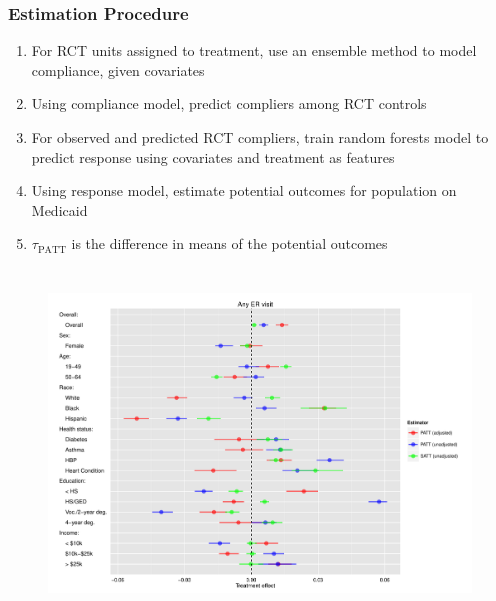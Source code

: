 \documentclass{beamer}
\begin{document}
\begin{frame} 
\frametitle{Estimation Procedure}
\begin{enumerate}
\item For RCT units assigned to treatment, use an ensemble method to model compliance, given covariates
\item Using compliance model, predict compliers among RCT controls
\item For observed and predicted RCT compliers, train random forests model to predict response using covariates and treatment as features
\item Using response model, estimate potential outcomes for population on Medicaid
\item $\tau_{\text{PATT}}$ is the difference in means of the potential outcomes
\end{enumerate}
\end{frame}


\section[Results]{}

\begin{frame}
\begin{figure}[htbp]
\begin{center}
   \includegraphics[scale=0.4]{../paper/any-visit-plot-horz.pdf} 
   \label{het-plot-av}
   \end{center}
\end{figure}
\end{frame}
\end{document}
